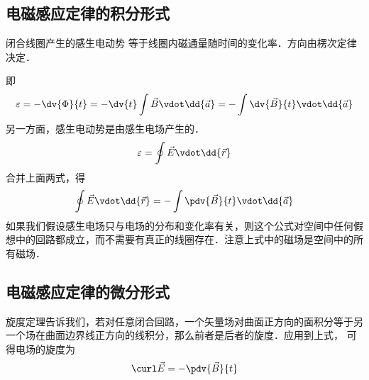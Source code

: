 

\subsection{电磁感应定律的积分形式}

闭合线圈产生的感生电动势%
等于线圈内磁通量随时间的变化率．方向由楞次定律%
决定．

即
\begin{equation}
\varepsilon  =  -\dv{\Phi}{t} =  - \dv{t} \int \vec B \vdot \dd{\vec a} =  - \int \dv{\vec B}{t} \vdot \dd{\vec a}
\end{equation} 
另一方面，感生电动势是由感生电场产生的． 
\begin{equation}
\varepsilon  = \oint \vec E \vdot \dd{\vec r}
\end{equation} 
合并上面两式，得
\begin{equation}
\oint \vec E \vdot \dd{\vec r}  =  - \int \pdv{\vec B}{t} \vdot \dd{\vec a} 
\end{equation} 
如果我们假设感生电场只与电场的分布和变化率有关，则这个公式对空间中任何假想中的回路都成立，而不需要有真正的线圈存在．注意上式中的磁场是空间中的所有磁场． 
\subsection{电磁感应定律的微分形式}

旋度定理告诉我们，若对任意闭合回路，一个矢量场对曲面正方向的面积分等于另一个场在曲面边界线正方向的线积分，那么前者是后者的旋度．应用到上式， 可得电场的旋度为
\begin{equation}
\curl \vec E =  - \pdv{\vec B}{t}
\end{equation} 

